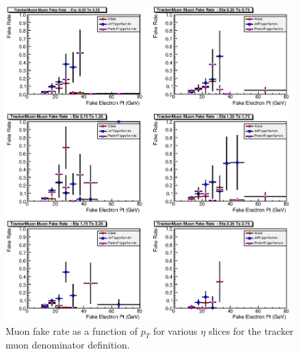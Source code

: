\documentclass{cmspaper}
\begin{document}
\begin{figure}[htb]
\begin{center}
\includegraphics[width=0.98\textwidth]{plots/TrackerMuonFakeRateEtaSlices.eps}
   \caption{Muon fake rate as a function of $p_T$ for various $\eta$ slices for the tracker muon denominator definition. }
   \label{fig:muonFR_trackermuon_etaslices}
\end{center}
\end{figure}
\end{document}
